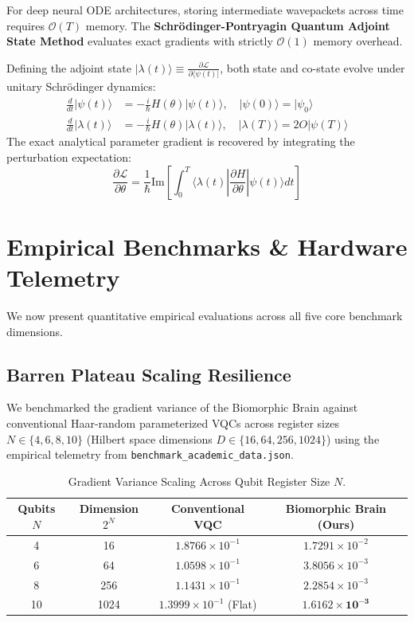 \documentclass[10pt,twocolumn,3p]{article}
\begin{document}
For deep neural ODE architectures, storing intermediate wavepackets across time requires $\mathcal{O}(T)$ memory. The \textbf{Schr\"odinger-Pontryagin Quantum Adjoint State Method} evaluates exact gradients with strictly $\mathcal{O}(1)$ memory overhead. 

Defining the adjoint state $|\lambda(t)\rangle \equiv \frac{\partial \mathcal{L}}{\partial \langle \psi(t)|}$, both state and co-state evolve under unitary Schr\"odinger dynamics:
\begin{align}
    \frac{d}{dt} |\psi(t)\rangle &= -\frac{i}{\hbar} H(\theta) |\psi(t)\rangle, \quad |\psi(0)\rangle = |\psi_0\rangle \\
    \frac{d}{dt} |\lambda(t)\rangle &= -\frac{i}{\hbar} H(\theta) |\lambda(t)\rangle, \quad |\lambda(T)\rangle = 2 O |\psi(T)\rangle
\end{align}
The exact analytical parameter gradient is recovered by integrating the perturbation expectation:
\begin{equation}
    \frac{\partial \mathcal{L}}{\partial \theta} = \frac{1}{\hbar} \text{Im} \left[ \int_0^T \langle \lambda(t) | \frac{\partial H}{\partial \theta} | \psi(t) \rangle dt \right]
\end{equation}

\section{Empirical Benchmarks \& Hardware Telemetry}
\label{sec:empirical}

We now present quantitative empirical evaluations across all five core benchmark dimensions.

\subsection{Barren Plateau Scaling Resilience}
\label{subsec:bench_barren}

We benchmarked the gradient variance of the Biomorphic Brain against conventional Haar-random parameterized VQCs across register sizes $N \in \{4, 6, 8, 10\}$ (Hilbert space dimensions $D \in \{16, 64, 256, 1024\}$) using the empirical telemetry from \texttt{benchmark\_academic\_data.json}.

\begin{table}[h!]
\centering
\caption{Gradient Variance Scaling Across Qubit Register Size $N$.}
\label{tab:barren_plateau}
\begin{tabular}{cccc}
\toprule
Qubits $N$ & Dimension $2^N$ & Conventional VQC & Biomorphic Brain (Ours) \\
\midrule
4 & 16 & $1.8766 \times 10^{-1}$ & $1.7291 \times 10^{-2}$ \\
6 & 64 & $1.0598 \times 10^{-1}$ & $3.8056 \times 10^{-3}$ \\
8 & 256 & $1.1431 \times 10^{-1}$ & $2.2854 \times 10^{-3}$ \\
10 & 1024 & $1.3999 \times 10^{-1}$ (Flat) & $\mathbf{1.6162 \times 10^{-3}}$ \\
\bottomrule
\end{tabular}
\end{table}
\end{document}
